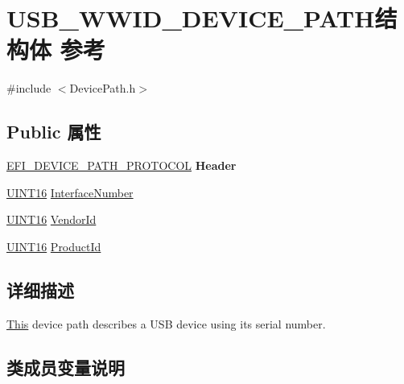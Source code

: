 \hypertarget{struct_u_s_b___w_w_i_d___d_e_v_i_c_e___p_a_t_h}{}\section{U\+S\+B\+\_\+\+W\+W\+I\+D\+\_\+\+D\+E\+V\+I\+C\+E\+\_\+\+P\+A\+T\+H结构体 参考}
\label{struct_u_s_b___w_w_i_d___d_e_v_i_c_e___p_a_t_h}


{\ttfamily \#include $<$Device\+Path.\+h$>$}

\subsection*{Public 属性}
\begin{DoxyCompactItemize}
\item 
\mbox{\label{struct_u_s_b___w_w_i_d___d_e_v_i_c_e___p_a_t_h_a1a381ab11350372ec730bfbb91557e7e}} 
\hyperlink{struct_e_f_i___d_e_v_i_c_e___p_a_t_h___p_r_o_t_o_c_o_l}{E\+F\+I\+\_\+\+D\+E\+V\+I\+C\+E\+\_\+\+P\+A\+T\+H\+\_\+\+P\+R\+O\+T\+O\+C\+OL} {\bfseries Header}
\item 
\hyperlink{_processor_bind_8h_a09f1a1fb2293e33483cc8d44aefb1eb1}{U\+I\+N\+T16} \hyperlink{struct_u_s_b___w_w_i_d___d_e_v_i_c_e___p_a_t_h_aeb6736f787b363d572cd23d3568ac108}{Interface\+Number}
\item 
\hyperlink{_processor_bind_8h_a09f1a1fb2293e33483cc8d44aefb1eb1}{U\+I\+N\+T16} \hyperlink{struct_u_s_b___w_w_i_d___d_e_v_i_c_e___p_a_t_h_aac7aee63e909b9e5c013494e3147985b}{Vendor\+Id}
\item 
\hyperlink{_processor_bind_8h_a09f1a1fb2293e33483cc8d44aefb1eb1}{U\+I\+N\+T16} \hyperlink{struct_u_s_b___w_w_i_d___d_e_v_i_c_e___p_a_t_h_a4c6a4534c5e2023d00878108ffe7a21a}{Product\+Id}
\end{DoxyCompactItemize}


\subsection{详细描述}
\hyperlink{namespace_this}{This} device path describes a U\+SB device using its serial number. 

\subsection{类成员变量说明}
\mbox{\label{struct_u_s_b___w_w_i_d___d_e_v_i_c_e___p_a_t_h_aeb6736f787b363d572cd23d3568ac108}} 
